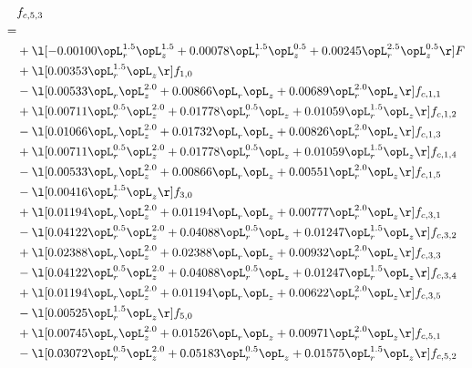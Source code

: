 \begin{alignat}{2} 
\label{eq:f_53_1} 
& f_{c,5,3} \nonumber \\ 
 = \\ 
& + \l[  -0.00100 \opL_r^{1.5} \opL_z^{1.5} +  0.00078 \opL_r^{1.5} \opL_z^{0.5} +  0.00245 \opL_r^{2.5} \opL_z^{0.5}  \r] F \nonumber \\ 
& + \l[  0.00353 \opL_r^{1.5} \opL_z  \r] f_{1,0} \nonumber \\ 
& - \l[  0.00533 \opL_r \opL_z^{2.0} +  0.00866 \opL_r \opL_z +  0.00689 \opL_r^{2.0} \opL_z  \r] f_{c,1,1} \nonumber \\ 
& + \l[  0.00711 \opL_r^{0.5} \opL_z^{2.0} +  0.01778 \opL_r^{0.5} \opL_z +  0.01059 \opL_r^{1.5} \opL_z  \r] f_{c,1,2} \nonumber \\ 
& - \l[  0.01066 \opL_r \opL_z^{2.0} +  0.01732 \opL_r \opL_z +  0.00826 \opL_r^{2.0} \opL_z  \r] f_{c,1,3} \nonumber \\ 
& + \l[  0.00711 \opL_r^{0.5} \opL_z^{2.0} +  0.01778 \opL_r^{0.5} \opL_z +  0.01059 \opL_r^{1.5} \opL_z  \r] f_{c,1,4} \nonumber \\ 
& - \l[  0.00533 \opL_r \opL_z^{2.0} +  0.00866 \opL_r \opL_z +  0.00551 \opL_r^{2.0} \opL_z  \r] f_{c,1,5} \nonumber \\ 
& - \l[  0.00416 \opL_r^{1.5} \opL_z  \r] f_{3,0} \nonumber \\ 
& + \l[  0.01194 \opL_r \opL_z^{2.0} +  0.01194 \opL_r \opL_z +  0.00777 \opL_r^{2.0} \opL_z  \r] f_{c,3,1} \nonumber \\ 
& - \l[  0.04122 \opL_r^{0.5} \opL_z^{2.0} +  0.04088 \opL_r^{0.5} \opL_z +  0.01247 \opL_r^{1.5} \opL_z  \r] f_{c,3,2} \nonumber \\ 
& + \l[  0.02388 \opL_r \opL_z^{2.0} +  0.02388 \opL_r \opL_z +  0.00932 \opL_r^{2.0} \opL_z  \r] f_{c,3,3} \nonumber \\ 
& - \l[  0.04122 \opL_r^{0.5} \opL_z^{2.0} +  0.04088 \opL_r^{0.5} \opL_z +  0.01247 \opL_r^{1.5} \opL_z  \r] f_{c,3,4} \nonumber \\ 
& + \l[  0.01194 \opL_r \opL_z^{2.0} +  0.01194 \opL_r \opL_z +  0.00622 \opL_r^{2.0} \opL_z  \r] f_{c,3,5} \nonumber \\ 
& - \l[  0.00525 \opL_r^{1.5} \opL_z  \r] f_{5,0} \nonumber \\ 
& + \l[  0.00745 \opL_r \opL_z^{2.0} +  0.01526 \opL_r \opL_z +  0.00971 \opL_r^{2.0} \opL_z  \r] f_{c,5,1} \nonumber \\ 
& - \l[  0.03072 \opL_r^{0.5} \opL_z^{2.0} +  0.05183 \opL_r^{0.5} \opL_z +  0.01575 \opL_r^{1.5} \opL_z  \r] f_{c,5,2} \nonumber \\ 

\end{alignat}

